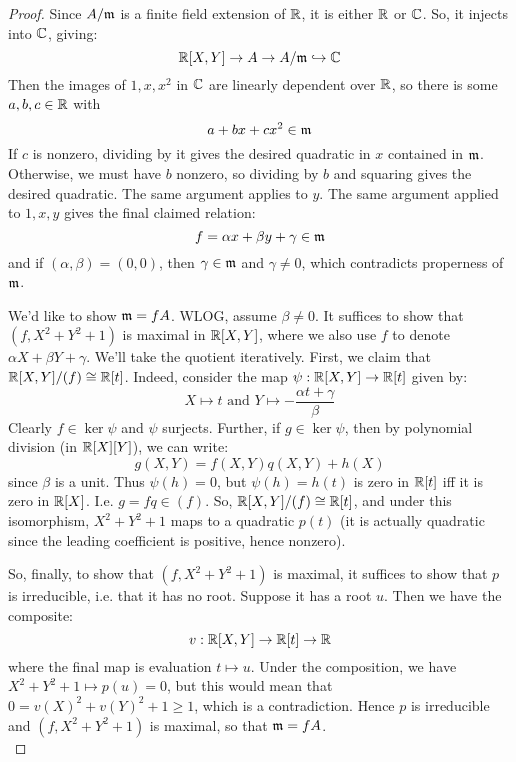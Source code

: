 \begin{proof}
	Since $A/\mathfrak{m}$ is a finite field extension of $\mathbb{R}$, it is either $\mathbb{R}$ or $\mathbb{C}$. So, it injects into $\mathbb{C}$, giving:
	\[ \mathbb{R}[X,Y] \to A \to A/\mathfrak{m} \hookrightarrow \mathbb{C} \]
	Then the images of $1,x,x^2$ in $\mathbb{C}$ are linearly dependent over $\mathbb{R}$, so there is some $a,b,c \in \mathbb{R}$ with
	\[ a+bx+cx^2 \in \mathfrak{m} \]
	If $c$ is nonzero, dividing by it gives the desired quadratic in $x$ contained in $\mathfrak{m}$. Otherwise, we must have $b$ nonzero, so dividing by $b$ and squaring gives the desired quadratic. The same argument applies to $y$. The same argument applied to $1,x,y$ gives the final claimed relation:
	\[ f = \alpha x + \beta y + \gamma \in \mathfrak{m} \]
	and if $(\alpha,\beta) = (0,0)$, then $\gamma \in \mathfrak{m}$ and $\gamma \neq 0$, which contradicts properness of $\mathfrak{m}$.
	
	We'd like to show $\mathfrak{m} = fA$. WLOG, assume $\beta \neq 0$. It suffices to show that $(f,X^2+Y^2+1)$ is maximal in $\mathbb{R}[X,Y]$, where we also use $f$ to denote $\alpha X + \beta Y + \gamma$. We'll take the quotient iteratively. First, we claim that $\mathbb{R}[X,Y]/(f) \cong \mathbb{R}[t]$. Indeed, consider the map $\psi : \mathbb{R}[X,Y] \to \mathbb{R}[t]$ given by:
	\[ X \mapsto t \text{ and } Y \mapsto -\frac{\alpha t + \gamma}{\beta} \]
	Clearly $f \in \ker\psi$ and $\psi$ surjects. Further, if $g \in \ker\psi$, then by polynomial division (in $\mathbb{R}[X][Y]$), we can write:
	\[ g(X,Y) = f(X,Y)q(X,Y) + h(X) \]
	since $\beta$ is a unit. Thus $\psi(h) = 0$, but $\psi(h) = h(t)$ is zero in $\mathbb{R}[t]$ iff it is zero in $\mathbb{R}[X]$. I.e. $g = fq \in (f)$. So, $\mathbb{R}[X,Y]/(f) \cong \mathbb{R}[t]$, and under this isomorphism, $X^2+Y^2+1$ maps to a quadratic $p(t)$ (it is actually quadratic since the leading coefficient is positive, hence nonzero).
	
	So, finally, to show that $(f,X^2+Y^2+1)$ is maximal, it suffices to show that $p$ is irreducible, i.e. that it has no root. Suppose it has a root $u$. Then we have the composite:
	\[ v : \mathbb{R}[X,Y] \to \mathbb{R}[t] \to \mathbb{R} \]
	where the final map is evaluation $t \mapsto u$. Under the composition, we have $X^2+Y^2+1 \mapsto p(u) = 0$, but this would mean that $0 = v(X)^2+v(Y)^2+1 \geq 1$, which is a contradiction. Hence $p$ is irreducible and $(f,X^2+Y^2+1)$ is maximal, so that $\mathfrak{m} = fA$. \\
	

\end{proof}
